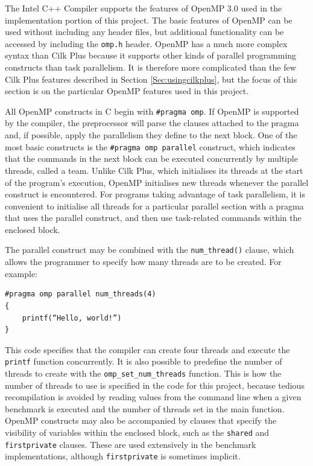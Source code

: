 \documentclass{report}
\newenvironment{mono}{\fontfamily{ttfamily}\selectfont}{\par}
\newenvironment{embedcode}{\begin{changemargin}{6em}{3em}\begin{mono}{}}{\end{mono}\end{changemargin}}
\begin{document}
The Intel C++ Compiler supports the features of OpenMP 3.0 used in the implementation portion of this project. The basic features of OpenMP can be used without including any header files, but additional functionality can be accessed by including the \verb!omp.h! header\cite{Jeffers13}. OpenMP has a much more complex syntax than Cilk Plus because it supports other kinds of parallel programming constructs than task parallelism\cite{openmpspec}. It is therefore more complicated than the few Cilk Plus features described in Section \ref{Sec:usingcilkplus}, but the focus of this section is on the particular OpenMP features used in this project. 

All OpenMP constructs in C begin with \verb!#pragma omp!. If OpenMP is supported by the compiler, the preprocessor will parse the clauses attached to the pragma and, if possible, apply the parallelism they define to the next block. One of the most basic constructs is the \verb!#pragma omp parallel! construct, which indicates that the commands in the next block can be executed concurrently by multiple threads, called a team\cite{openmpspec}. Unlike Cilk Plus, which initialises its threads at the start of the program's execution, OpenMP initialises new threads whenever the parallel construct is encountered. For programs taking advantage of task parallelism, it is convenient to initialise all threads for a particular parallel section with a pragma that uses the parallel construct, and then use task-related commands within the enclosed block.

The parallel construct may be combined with the \verb!num_thread()! clause, which allows the programmer to specify how many threads are to be created. For example:

\begin{embedcode}
\begin{verbatim}
#pragma omp parallel num_threads(4)
{
    printf(“Hello, world!”)
}
\end{verbatim}
\end{embedcode}

This code specifies that the compiler can create four threads and execute the \verb!printf! function concurrently. It is also possible to predefine the number of threads to create with the \verb!omp_set_num_threads! function. This is how the number of threads to use is specified in the code for this project, because tedious recompilation is avoided by reading values from the command line when a given benchmark is executed and the number of threads set in the main function. OpenMP constructs may also be accompanied by clauses that specify the visibility of variables within the enclosed block, such as the \verb!shared! and \verb!firstprivate! clauses. These are used extensively in the benchmark implementations, although \verb!firstprivate! is sometimes implicit\cite{openmpspec}.
\end{document}

